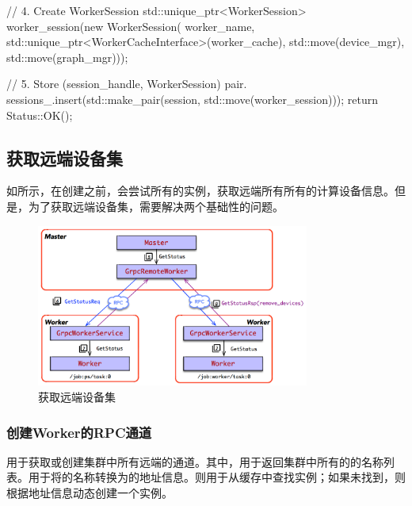 \begin{content}
\begin{leftbar}
\begin{c++}
{  // 4. Create WorkerSession
  std::unique_ptr<WorkerSession> worker_session(new WorkerSession(
      worker_name, std::unique_ptr<WorkerCacheInterface>(worker_cache),
      std::move(device_mgr), std::move(graph_mgr)));

  // 5. Store (session\_handle, WorkerSession) pair.
  sessions_.insert(std::make_pair(session, std::move(worker_session)));
  return Status::OK();
}
\end{c++}
\end{leftbar}

\subsection{获取远端设备集}

如所示，在创建之前，会尝试所有的实例，获取远端所有所有的计算设备信息。但是，为了获取远端设备集，需要解决两个基础性的问题。

\begin{enum}
\end{enum}

\begin{figure}[H]
\centering
\includegraphics[width=0.8\textwidth]{figures/dist-worker-get-status.png}
\caption{获取远端设备集}
 \label{fig:dist-worker-get-status}
\end{figure}

\subsubsection{创建Worker的RPC通道}

用于获取或创建集群中所有远端的通道。其中，用于返回集群中所有的的名称列表。用于将的名称转换为的地址信息。则用于从缓存中查找实例；如果未找到，则根据地址信息动态创建一个实例。


\end{content}
